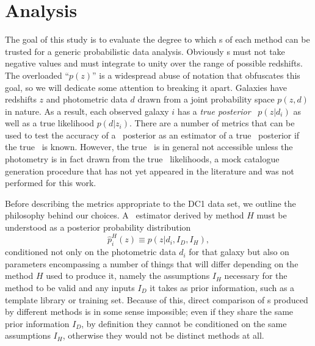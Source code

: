 \section{Analysis}
\label{sec:metrics}



The goal of this study is to evaluate the degree to which \pzpdf s of each method can be trusted for a generic probabilistic data analysis.
Obviously \pzpdf s must not take negative values and must integrate to unity over the range of possible redshifts.
The overloaded ``$p(z)$'' is a widespread abuse of notation that obfuscates this goal, so we will dedicate some attention to breaking it apart.
Galaxies have redshifts $z$ and photometric data $d$ drawn from a joint probability space $p(z, d)$ in nature.
As a result, each observed galaxy $i$ has a \textit{true posterior \pzpdf}\ $p(z \vert d_{i})$ as well as a true likelihood $p(d \vert z_{i})$.
There are a number of metrics that can be used to test the accuracy of a \pz\ posterior as an estimator of a true \pz\ posterior if the true \pzpdf\ is known.
However, the true \pzpdf\ is in general not accessible unless the photometry is in fact drawn from the true \pz\ likelihoods, a mock catalogue generation procedure that has not yet appeared in the literature and was not performed for this work.

Before describing the metrics appropriate to the DC1 data set, we outline the philosophy behind our choices.
A \pzpdf\ estimator derived by method $H$ must be understood as a posterior probability distribution
\begin{equation}
\hat{p}^{H}_{i}(z) \equiv p(z \vert d_{i}, I_{D}, I_{H}),
\end{equation}
conditioned not only on the photometric data $d_{i}$ for that galaxy but also on parameters encompassing a number of things that will differ depending on the method $H$ used to produce it, namely the assumptions $I_{H}$ necessary for the method to be valid and any inputs $I_{D}$ it takes as prior information, such as a template library or training set.
Because of this, direct comparison of \pzpdf s produced by different methods is in some sense impossible; even if they share the same prior information $I_{D}$, by definition they cannot be conditioned on the same assumptions $I_{H}$, otherwise they would not be distinct methods at all.

